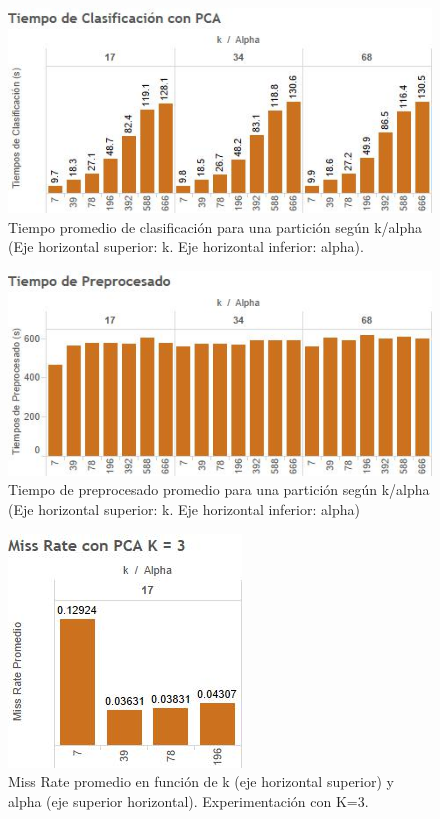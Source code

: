 \documentclass{article}
\begin{document}
\begin{figure}[H]
\centering
\includegraphics[scale=0.90]{TiempoClasificacionPCA.jpg}
\caption{Tiempo promedio de clasificación para una partición según k/alpha (Eje horizontal superior: k. Eje horizontal inferior: alpha). }
\label{fig:TiempoPCA}
\end{figure}


\begin{figure}[H]
\centering
\includegraphics[scale=0.90]{preprocesado.jpg}
\caption{Tiempo de preprocesado promedio para una partición según k/alpha  (Eje horizontal superior: k. Eje horizontal inferior: alpha)}
\label{fig:Preprocesado}
\end{figure} 

\begin{figure}[H]
\centering
\includegraphics[scale=0.90]{MissRatesdePCAK3.jpg}
\caption{Miss Rate promedio en función de k (eje horizontal superior) y alpha (eje superior horizontal). Experimentación con K=3.}
\label{fig:MissRatePCA3}
\end{figure} 
\end{document}

